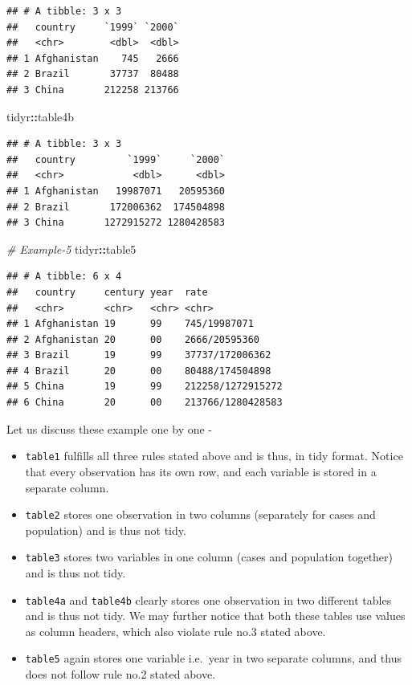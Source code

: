 \documentclass[
]{book}
\newenvironment{Shaded}{\begin{snugshade}}{\end{snugshade}}
\newcommand{\CommentTok}[1]{\textcolor[rgb]{0.56,0.35,0.01}{\textit{#1}}}
\newcommand{\NormalTok}[1]{#1}
\newcommand{\SpecialCharTok}[1]{\textcolor[rgb]{0.81,0.36,0.00}{\textbf{#1}}}
\providecommand{\tightlist}{%
  \setlength{\itemsep}{0pt}\setlength{\parskip}{0pt}}
\begin{document}
\begin{verbatim}
## # A tibble: 3 x 3
##   country     `1999` `2000`
##   <chr>        <dbl>  <dbl>
## 1 Afghanistan    745   2666
## 2 Brazil       37737  80488
## 3 China       212258 213766
\end{verbatim}

\begin{Shaded}
\begin{Highlighting}[]
\NormalTok{tidyr}\SpecialCharTok{::}\NormalTok{table4b}
\end{Highlighting}
\end{Shaded}

\begin{verbatim}
## # A tibble: 3 x 3
##   country         `1999`     `2000`
##   <chr>            <dbl>      <dbl>
## 1 Afghanistan   19987071   20595360
## 2 Brazil       172006362  174504898
## 3 China       1272915272 1280428583
\end{verbatim}

\begin{Shaded}
\begin{Highlighting}[]
\CommentTok{\# Example{-}5}
\NormalTok{tidyr}\SpecialCharTok{::}\NormalTok{table5}
\end{Highlighting}
\end{Shaded}

\begin{verbatim}
## # A tibble: 6 x 4
##   country     century year  rate             
##   <chr>       <chr>   <chr> <chr>            
## 1 Afghanistan 19      99    745/19987071     
## 2 Afghanistan 20      00    2666/20595360    
## 3 Brazil      19      99    37737/172006362  
## 4 Brazil      20      00    80488/174504898  
## 5 China       19      99    212258/1272915272
## 6 China       20      00    213766/1280428583
\end{verbatim}

Let us discuss these example one by one -

\begin{itemize}
\tightlist
\item
  \texttt{table1} fulfills all three rules stated above and is thus, in tidy format. Notice that every observation has its own row, and each variable is stored in a separate column.
\item
  \texttt{table2} stores one observation in two columns (separately for cases and population) and is thus not tidy.
\item
  \texttt{table3} stores two variables in one column (cases and population together) and is thus not tidy.
\item
  \texttt{table4a} and \texttt{table4b} clearly stores one observation in two different tables and is thus not tidy. We may further notice that both these tables use values as column headers, which also violate rule no.3 stated above.
\item
  \texttt{table5} again stores one variable i.e.~year in two separate columns, and thus does not follow rule no.2 stated above.
\end{itemize}
\end{document}
